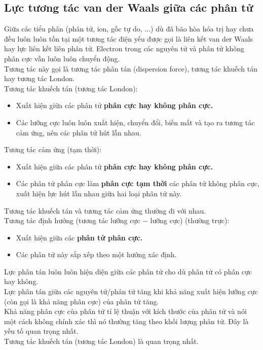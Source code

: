 \subsection{Lực tương tác van der Waals giữa các phân tử}
Giữa các tiểu phân (phân tử, ion, gốc tự do, ...) dù đã bão hòa hóa trị hay chưa đều luôn luôn tồn tại một tương tác điện yếu được gọi là liên kết van der Waals hay lực liên kết liên phân tử.
Electron trong các nguyên tử và phân tử không phân cực vẫn luôn luôn chuyển động.\\
Tương tác này gọi là tương tác phân tán (dispersion force), tương tác khuếch tán hay tương tác London.\\
Tương tác khuếch tán (tương tác London):
\begin{itemize}
\item Xuất hiện giữa các phân tử \textbf{phân cực hay không phân cực.} 
\item Các lưỡng cực luôn luôn xuất hiện, chuyển đổi, biến mất và tạo ra tương tác cảm ứng, nên các phân tử hút lẫn nhau.
\end{itemize}
Tương tác cảm ứng (tạm thời):
\begin{itemize}
\item Xuất hiện giữa các phân tử \textbf{phân cực hay không phân cực.}
\item Các phân tử phân cực làm \textbf{phân cực tạm thời} các phân tử không phân cực, xuất hiện lực hút lẫn nhau giữa hai loại phân tử này.
\end{itemize}
Tương tác khuếch tán và tương tác cảm ứng thường đi với nhau.\\
Tương tác định hướng (tương tác lưỡng cực $-$ lưỡng cực) (thường trực):
\begin{itemize}
\item Xuất hiện giữa các \textbf{phân tử phân cực.}
\item Các phân tử này sắp xếp theo một hướng xác định.
\end{itemize}
Lực phân tán luôn luôn hiện diện giữa các phân tử cho dù phân tử có phân cực hay không.\\
Lực phân tán giữa các nguyên tử/phân tử tăng khi khả năng xuất hiện lưỡng cực (còn gọi là khả năng phân cực) của phân tử tăng.\\
Khả năng phân cực của phân tử tỉ lệ thuận với kích thước của phân tử và nói một cách không chính xác thì nó thường tăng theo khối lượng phân tử. Đây là yếu tố quan trọng nhất.\\
Tương tác khuếch tán (tương tác London) là quan trọng nhất.
